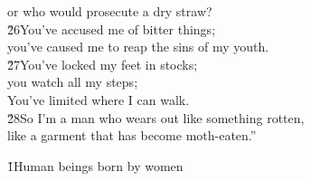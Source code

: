 \begin{poetry}
\poemll    or who would prosecute a dry straw? \\
\poeml \v{26}You've accused me of bitter things; \\
\poemll    you've caused me to reap the sins of my youth. \\
\poeml \v{27}You've locked my feet in stocks; \\
\poemll    you watch all my steps; \\
\poemlll       You've limited where I can walk. \\
\poeml \v{28}So I'm a man who wears out like something rotten, \\
\poemll    like a garment that has become moth-eaten.''
\end{poetry}

\v{1}Human beings born by women

